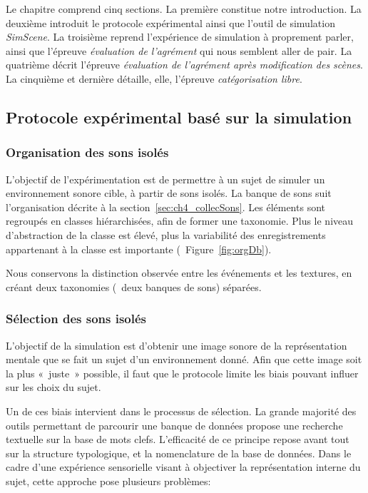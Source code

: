 Le chapitre comprend cinq sections. La première constitue notre introduction. La deuxième introduit le protocole expérimental ainsi que l'outil de simulation \emph{SimScene}. La troisième reprend l'expérience de simulation à proprement parler, ainsi que l'épreuve \emph{évaluation de l'agrément} qui nous semblent aller de pair. La quatrième décrit l'épreuve \emph{évaluation de l'agrément après modification des scènes}. La cinquième et dernière détaille, elle, l'épreuve \emph{catégorisation libre}.

 
\subsection{Protocole expérimental basé sur la simulation}

\subsubsection{Organisation des sons isolés}
\label{sec:ch4_dbEventTexture}

L'objectif de l'expérimentation est de permettre à un sujet de simuler un environnement sonore cible, à partir de sons isolés. La banque de sons suit l'organisation décrite à la section~\ref{sec:ch4_collecSons}. Les éléments sont regroupés en classes hiérarchisées, afin de former une taxonomie. Plus le niveau d'abstraction de la classe est élevé, plus la variabilité des enregistrements appartenant à la classe est importante (\cf~Figure~\ref{fig:orgDb}).
 
Nous conservons la distinction observée entre les événements et les textures, en créant deux taxonomies (\ie~deux banques de sons) séparées.

\subsubsection{Sélection des sons isolés}

L'objectif de la simulation est d'obtenir une image sonore de la représentation mentale que se fait un sujet d'un environnement donné. Afin que cette image soit la plus «~juste~» possible, il faut que le protocole limite les biais pouvant influer sur les choix du sujet.

Un de ces biais intervient dans le processus de sélection. La grande majorité des outils permettant de parcourir une banque de données propose une recherche textuelle sur la base de mots clefs. L’efficacité de ce principe repose avant tout sur la structure typologique, et la nomenclature de la base de données. Dans le cadre d'une expérience sensorielle visant à objectiver la représentation interne du sujet, cette approche pose plusieurs problèmes:

